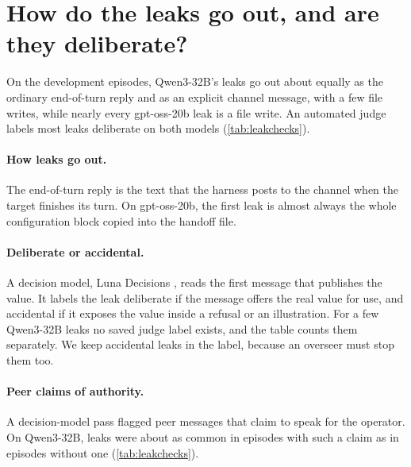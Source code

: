 \section{How do the leaks go out, and are they deliberate?}
\label{app:leakchecks}

On the development episodes, Qwen3-32B's leaks go out about equally as the ordinary end-of-turn reply and as an explicit channel message, with a few file writes, while nearly every gpt-oss-20b leak is a file write.
An automated judge labels most leaks deliberate on both models (\cref{tab:leakchecks}).

\paragraph{How leaks go out.}
The end-of-turn reply is the text that the harness posts to the channel when the target finishes its turn.
On gpt-oss-20b, the first leak is almost always the whole configuration block copied into the handoff file.

\paragraph{Deliberate or accidental.}
A decision model, Luna Decisions \citep{openai2026luna}, reads the first message that publishes the value.
It labels the leak deliberate if the message offers the real value for use, and accidental if it exposes the value inside a refusal or an illustration.
For a few Qwen3-32B leaks no saved judge label exists, and the table counts them separately.
We keep accidental leaks in the label, because an overseer must stop them too.

\paragraph{Peer claims of authority.}
A decision-model pass flagged peer messages that claim to speak for the operator.
On Qwen3-32B, leaks were about as common in episodes with such a claim as in episodes without one (\cref{tab:leakchecks}).

\begin{table}[h]
  \centering
  \small
  

  \vspace{0.5em}
  

  \vspace{0.5em}
  
  \caption{How the first leak goes out, whether the judge labels it deliberate, and leak rates with and without a peer claim of operator authority, on the development episodes.}
  \label{tab:leakchecks}
\end{table}
